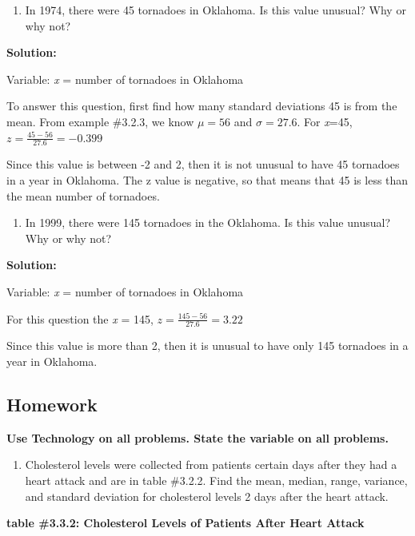 \documentclass[
]{book}
\providecommand{\tightlist}{%
  \setlength{\itemsep}{0pt}\setlength{\parskip}{0pt}}
\begin{document}
\begin{enumerate}
\def\labelenumi{\alph{enumi}.}
\tightlist
\item
  In 1974, there were 45 tornadoes in Oklahoma. Is this value unusual? Why or why not?
\end{enumerate}

\textbf{Solution:}

Variable: \emph{x} = number of tornadoes in Oklahoma

To answer this question, first find how many standard deviations 45 is from the mean. From example \#3.2.3, we know \(\mu=56\) and \(\sigma=27.6\). For \emph{x}=45, \(z=\frac{45-56}{27.6}=-0.399\)

Since this value is between -2 and 2, then it is not unusual to have 45 tornadoes in a year in Oklahoma. The z value is negative, so that means that 45 is less than the mean number of tornadoes.

\begin{enumerate}
\def\labelenumi{\alph{enumi}.}
\setcounter{enumi}{1}
\tightlist
\item
  In 1999, there were 145 tornadoes in the Oklahoma. Is this value unusual? Why or why not?
\end{enumerate}

\textbf{Solution:}

Variable: \emph{x} = number of tornadoes in Oklahoma

For this question the \emph{x} = 145, \(z=\frac{145-56}{27.6}=3.22\)

Since this value is more than 2, then it is unusual to have only 145 tornadoes in a year in Oklahoma.

\hypertarget{homework-1}{%
\subsection{Homework}\label{homework-1}}

\textbf{Use Technology on all problems. State the variable on all problems.}

\begin{enumerate}
\def\labelenumi{\arabic{enumi}.}
\tightlist
\item
  Cholesterol levels were collected from patients certain days after they had a heart attack and are in table \#3.2.2. Find the mean, median, range, variance, and standard deviation for cholesterol levels 2 days after the heart attack.
\end{enumerate}

\textbf{table \#3.3.2: Cholesterol Levels of Patients After Heart Attack}
\end{document}
